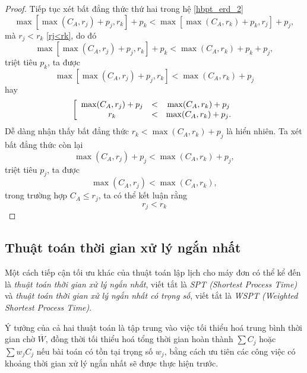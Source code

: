 \documentclass[12pt,a4paper]{report}
\begin{document}
\begin{proof}
	Tiếp tục xét bất đẳng thức thứ hai trong hệ \eqref{hbpt_erd_2}
	\begin{equation}
		\max \left[ \max (C_A, r_j) + p_j, r_k \right] + p_k < \max \left[ \max (C_A, r_k) + p_k, r_j \right] + p_j,
	\end{equation}
	mà $r_j<r_k$ \eqref{rj<rk}, do đó
	\begin{equation}
		\max \left[ \max (C_A, r_j) + p_j, r_k \right] + p_k < \max (C_A, r_k) + p_k + p_j,
	\end{equation}
	triệt tiêu $p_k$, ta được
	\begin{equation}
		\max \left[ \max (C_A, r_j) + p_j, r_k \right] < \max (C_A, r_k) + p_j
	\end{equation}
	hay
	\begin{equation}
		\left[
			\begin{array}{c c c}
				\max (C_A, r_j) + p_j &<& \max (C_A, r_k) + p_j \\
				r_k &<& \max (C_A, r_k) + p_j.
			\end{array}
		\right.
	\end{equation}
	Dễ dàng nhận thấy bất đẳng thức $r_k < \max (C_A, r_k) + p_j$ là hiển nhiên. Ta xét bất đẳng thức còn lại
	\begin{equation}
			\max (C_A, r_j) + p_j < \max (C_A, r_k) + p_j,
	\end{equation}
	triệt tiêu $p_j$, ta được
	\begin{equation}
			\max (C_A, r_j) < \max (C_A, r_k),
	\end{equation}
	trong trường hợp $C_A \leq r_j$, ta có thể kết luận rằng
	\begin{equation}
			r_j < r_k
	\end{equation}

\end{proof}


\subsection{Thuật toán thời gian xử lý ngắn nhất}
Một cách tiếp cận tối ưu khác của thuật toán lập lịch cho máy đơn có thể kể đến là \textit{thuật toán thời gian xử lý ngắn nhất}, viết tắt là \textit{SPT (Shortest Process Time)} và \textit{thuật toán thời gian xử lý ngắn nhất có trọng số}, viết tắt là \textit{WSPT (Weighted Shortest Process Time)}.

Ý tưởng của cả hai thuật toán là tập trung vào việc tối thiểu hoá trung bình thời gian chờ $\overline{W}$, đồng thời tối thiểu hoá tổng thời gian hoàn thành $\sum C_j$ hoặc $\sum w_j C_j$ nếu bài toán có tồn tại trọng số $w_j$, bằng cách ưu tiên các công việc có khoảng thời gian xử lý ngắn nhất sẽ được thực hiện trước. 
\end{document}
